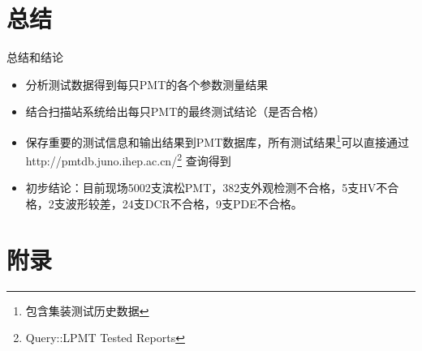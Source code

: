 \documentclass[11pt,compress,xcolor=x11names,UTF8]{beamer}
\begin{document}
\section{总结}

\begin{frame}{总结和结论}
\begin{itemize}
\item  分析测试数据得到每只PMT的各个参数测量结果
\item  结合扫描站系统给出每只PMT的最终测试结论（是否合格）
\item 保存重要的测试信息和输出结果到PMT数据库，所有测试结果\footnote{包含集装测试历史数据}可以直接通过http://pmtdb.juno.ihep.ac.cn/\footnote{Query::LPMT Tested Reports} 查询得到
\item 初步结论：目前现场5002支滨松PMT，382支外观检测不合格，5支HV不合格，2支波形较差，24支DCR不合格，9支PDE不合格。
\end{itemize}
\end{frame}

\begin{frame}
\end{frame}

\begin{frame}
\end{frame}

%
%

\appendix

\section*{附录}
\end{document}
